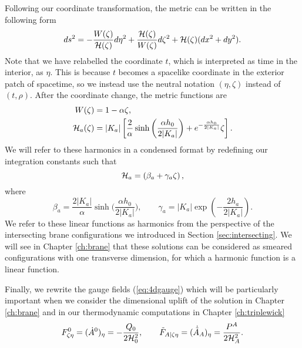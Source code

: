 Following our coordinate transformation, the metric can be written in the following form
\begin{equation}
\label{eq:3czmet}
ds^2 = -\frac{W(\zeta)}{{\cal H}(\zeta)} d\eta^2 +\frac{{\cal H}(\zeta)}{W(\zeta)} d \zeta^2 + {\cal H}(\zeta) (dx^2 + dy^2).
\end{equation}
Note that we have relabelled the coordinate $t$, which is interpreted as time in the interior, as $\eta$. This is because $t$ becomes a spacelike coordinate in the exterior patch of spacetime, so we instead use the neutral notation $(\eta, \zeta)$ instead of $(t, \rho)$. After the coordinate change, the metric functions are
\begin{equation*}
\begin{aligned}
	W(\zeta) &= 1 - \alpha \zeta, \\
    {\cal H}_a(\zeta) &= |K_a| \left[\frac{2}{\alpha} \sinh \bigg(\frac{\alpha h_0}{2 |K_a|}\bigg) + e^{-\frac{\alpha h_0}{2 |K_a|}} \zeta \right].
\end{aligned}
\end{equation*}
We will refer to these harmonics in a condensed format by redefining our integration constants such that
\begin{equation*}
     {\cal H}_a = \left(\beta_a + \gamma_a \zeta \right),
\end{equation*}
where 
\begin{equation*}
	\beta_a = \frac{2 |K_a|}{\alpha} \sinh \bigg(\frac{\alpha h_0}{2 |K_a|}\bigg), \qquad \gamma_a = |K_a| \exp \left({- \frac{2 h_a}{2 |K_a|}} \right).
\end{equation*}
We refer to these linear functions as harmonics from the perspective of the intersecting brane configurations we introduced in Section \ref{sec:intersecting}. We will see in Chapter \ref{ch:brane} that these solutions can be considered as smeared configurations with one transverse dimension, for which a harmonic function is a linear function. 

Finally, we rewrite the gauge fields (\ref{eq:4dgauge}) which will be particularly important when we consider the dimensional uplift of the solution in Chapter \ref{ch:brane} and in our thermodynamic computations in Chapter \ref{ch:triplewick}
\begin{equation}
\label{eq:new4dgauge}
    \begin{aligned}
        F^0_{\zeta \eta} = (\dot{A}^{0})_\eta = -\frac{Q_0}{2 {\cal H}_0^2}, \qquad \tilde{F}_{A |\zeta \eta} = (\dot{\tilde{A}}_A)_\eta = \frac{P^A}{2{\cal H}_A^2}.
    \end{aligned}
\end{equation}


